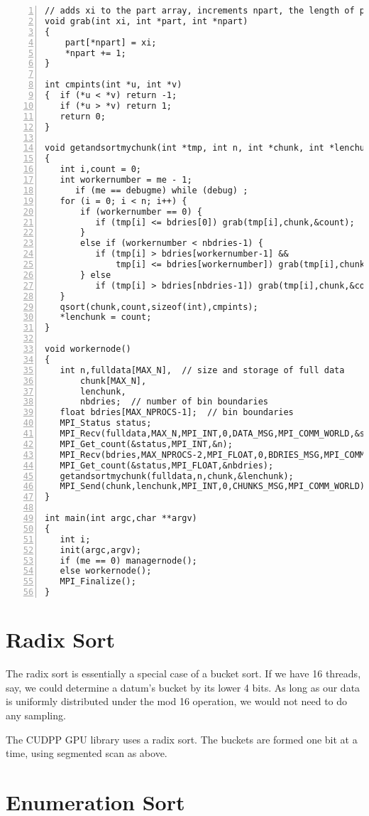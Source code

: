 \begin{lstlisting}[numbers=left]
// adds xi to the part array, increments npart, the length of part
void grab(int xi, int *part, int *npart)
{
    part[*npart] = xi;
    *npart += 1;
}

int cmpints(int *u, int *v)
{  if (*u < *v) return -1;
   if (*u > *v) return 1;
   return 0;
}

void getandsortmychunk(int *tmp, int n, int *chunk, int *lenchunk)
{
   int i,count = 0;
   int workernumber = me - 1;
      if (me == debugme) while (debug) ;
   for (i = 0; i < n; i++) {
       if (workernumber == 0) {
          if (tmp[i] <= bdries[0]) grab(tmp[i],chunk,&count);
       }
       else if (workernumber < nbdries-1) {
          if (tmp[i] > bdries[workernumber-1] && 
              tmp[i] <= bdries[workernumber]) grab(tmp[i],chunk,&count);
       } else
          if (tmp[i] > bdries[nbdries-1]) grab(tmp[i],chunk,&count);
   }
   qsort(chunk,count,sizeof(int),cmpints);
   *lenchunk = count;
}

void workernode()
{
   int n,fulldata[MAX_N],  // size and storage of full data
       chunk[MAX_N],
       lenchunk,
       nbdries;  // number of bin boundaries
   float bdries[MAX_NPROCS-1];  // bin boundaries
   MPI_Status status;
   MPI_Recv(fulldata,MAX_N,MPI_INT,0,DATA_MSG,MPI_COMM_WORLD,&status);
   MPI_Get_count(&status,MPI_INT,&n);
   MPI_Recv(bdries,MAX_NPROCS-2,MPI_FLOAT,0,BDRIES_MSG,MPI_COMM_WORLD,&status);
   MPI_Get_count(&status,MPI_FLOAT,&nbdries);
   getandsortmychunk(fulldata,n,chunk,&lenchunk);
   MPI_Send(chunk,lenchunk,MPI_INT,0,CHUNKS_MSG,MPI_COMM_WORLD);
}

int main(int argc,char **argv)
{  
   int i;
   init(argc,argv);
   if (me == 0) managernode();
   else workernode();
   MPI_Finalize();
}
\end{lstlisting}

\section{Radix Sort}

The radix sort is essentially a special case of a bucket sort.  If we
have 16 threads, say, we could determine a datum's bucket by its lower 4
bits.  As long as our data is uniformly distributed under the mod 16
operation, we would not need to do any sampling.

The CUDPP GPU library uses a radix sort.  The buckets are formed one bit
at a time, using segmented scan as above.

\section{Enumeration Sort}

